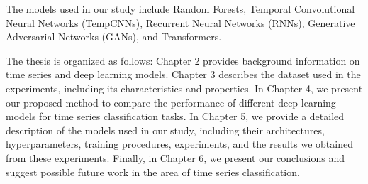 The models used in our study include Random Forests, Temporal Convolutional Neural Networks (TempCNNs), Recurrent Neural Networks (RNNs), Generative Adversarial Networks (GANs), and Transformers.

The thesis is organized as follows: Chapter 2 provides background information on time series and deep learning models.
Chapter 3 describes the dataset used in the experiments, including its characteristics and properties.
In Chapter 4, we present our proposed method to compare the performance of different deep learning models for time series classification tasks. 
In Chapter 5, we provide a detailed description of the models used in our study, including their architectures, hyperparameters, training procedures, experiments, and the results we obtained from these experiments.
Finally, in Chapter 6, we present our conclusions and suggest possible future work in the area of time series classification.